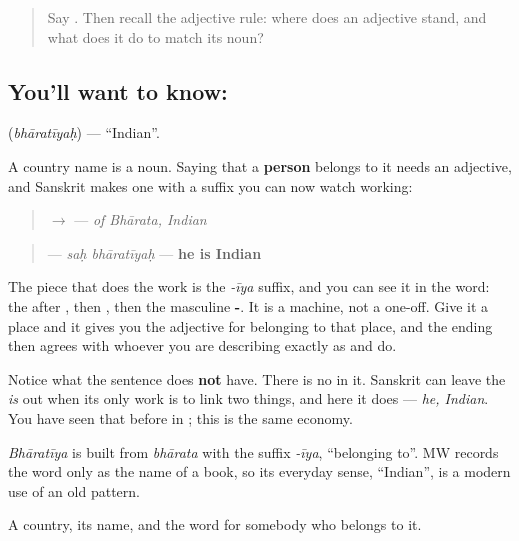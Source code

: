 \begin{quote}
Say \textbf{}. Then recall the adjective rule: where does an adjective stand, and what does it do to match its noun?
\end{quote}

\subsection*{You'll want to know: }
\textbf{} (\emph{bhāratīyaḥ}) — \textquotedblleft{}Indian\textquotedblright{}.

A country name is a noun. Saying that a \textbf{person} belongs to it needs an adjective, and Sanskrit makes one with a suffix you can now watch working:

\begin{quote}
\textbf{} $\to$ \textbf{} — \emph{of Bhārata, Indian}
\end{quote}

\begin{quote}
\textbf{ } — \emph{saḥ bhāratīyaḥ} — \textbf{he is Indian}
\end{quote}

The piece that does the work is the \emph{-īya} suffix, and you can see it in the word: the \textbf{} after \textbf{}, then \textbf{}, then the masculine \textbf{-}. It is a machine, not a one-off. Give it a place and it gives you the adjective for belonging to that place, and the ending then agrees with whoever you are describing exactly as \textbf{} and \textbf{} do.

Notice what the sentence does \textbf{not} have. There is no \textbf{} in it. Sanskrit can leave the \emph{is} out when its only work is to link two things, and here it does — \emph{he, Indian}. You have seen that before in \textbf{ }; this is the same economy.

\begin{cousinweb}
\emph{Bhāratīya} is built from \emph{bhārata} with the suffix \emph{-īya}, \textquotedblleft{}belonging to\textquotedblright{}. MW records the word only as the name of a book, so its everyday sense, \textquotedblleft{}Indian\textquotedblright{}, is a modern use of an old pattern.
\end{cousinweb}

\begin{grammarlens}[title={What you've built}]
A country, its name, and the word for somebody who belongs to it.
\end{grammarlens}

